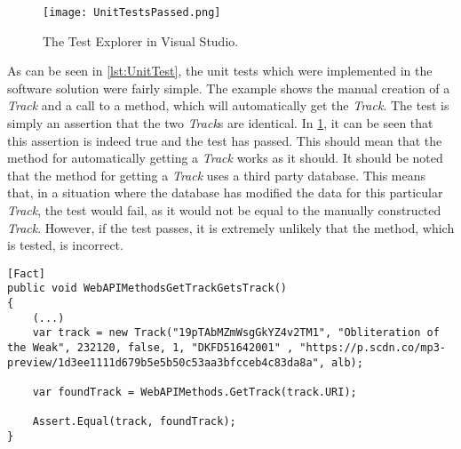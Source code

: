 \begin{figure}[H]
  \centering
  \texttt{[image: UnitTestsPassed.png]}
  \caption{The Test Explorer in Visual Studio.}\label{fig:UnitTestsPassed}
\end{figure}

As can be seen in \cref{lst:UnitTest}, the unit tests which were implemented in the software solution were fairly simple. The example shows the manual creation of a \emph{Track} and a call to a method, which will automatically get the \emph{Track}. The test is simply an assertion that the two \emph{Track}s are identical. In \cref{fig:UnitTestsPassed}, it can be seen that this assertion is indeed true and the test has passed. This should mean that the method for automatically getting a \emph{Track} works as it should. 
It should be noted that the method for getting a \emph{Track} uses a third party database. This means that, in a situation where the database has modified the data for this particular \emph{Track}, the test would fail, as it would not be equal to the manually constructed \emph{Track}. However, if the test passes, it is extremely unlikely that the method, which is tested, is incorrect.

\begin{lstlisting}[float, floatplacement=htpb,caption = {Test method for the automatic getting of a \textbf{Track}}, label = {lst:UnitTest}]
[Fact]
public void WebAPIMethodsGetTrackGetsTrack()
{
	(...)
	var track = new Track("19pTAbMZmWsgGkYZ4v2TM1", "Obliteration of the Weak", 232120, false, 1, "DKFD51642001" , "https://p.scdn.co/mp3-preview/1d3ee1111d679b5e5b50c53aa3bfcceb4c83da8a", alb);

	var foundTrack = WebAPIMethods.GetTrack(track.URI);

	Assert.Equal(track, foundTrack);
}
\end{lstlisting}
